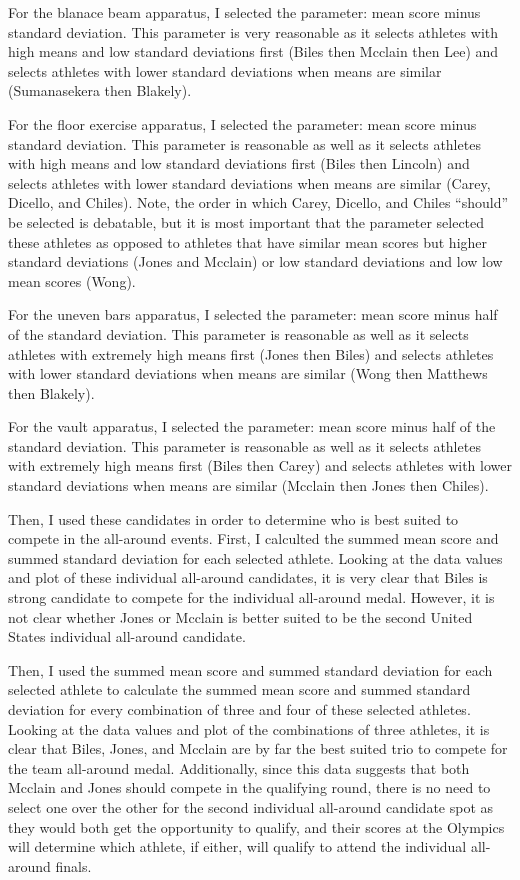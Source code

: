 \documentclass[12pt]{article}
\begin{document}
For the blanace beam apparatus, I selected the parameter: mean score minus standard deviation. This parameter 
is very reasonable as it selects athletes with high means and low standard deviations first (Biles then Mcclain 
then Lee) and selects athletes with lower standard deviations when means are similar (Sumanasekera then Blakely).

For the floor exercise apparatus, I selected the parameter: mean score minus standard deviation. This parameter 
is reasonable as well as it selects athletes with high means and low standard deviations first (Biles then Lincoln) 
and selects athletes with lower standard deviations when means are similar (Carey, Dicello, and Chiles). Note, the 
order in which Carey, Dicello, and Chiles ``should'' be selected is debatable, but it is most important that the 
parameter selected these athletes as opposed to athletes that have similar mean scores but higher standard deviations 
(Jones and Mcclain) or low standard deviations and low low mean scores (Wong).

For the uneven bars apparatus, I selected the parameter: mean score minus half of the standard deviation. 
This parameter is reasonable as well as it selects athletes with extremely high means first (Jones then Biles) and selects 
athletes with lower standard deviations when means are similar (Wong then Matthews then Blakely). 

For the vault apparatus, I selected the parameter: mean score minus half of the standard deviation. 
This parameter is reasonable as well as it selects athletes with extremely high means first (Biles then Carey) and selects 
athletes with lower standard deviations when means are similar (Mcclain then Jones then Chiles). 

Then, I used these candidates in order to determine who is best suited to compete in the all-around events. 
First, I calculted the summed mean score and summed standard deviation for each selected athlete. Looking at the data 
values and plot of these individual all-around candidates, it is very clear that Biles is strong candidate to 
compete for the individual all-around medal. However, it is not clear whether Jones or Mcclain is better suited 
to be the second United States individual all-around candidate.

Then, I used the summed mean score and summed standard deviation for each selected athlete to calculate the 
summed mean score and summed standard deviation for every combination of 
three and four of these selected athletes. Looking at the data values and plot of the combinations of three athletes, 
it is clear that Biles, Jones, and Mcclain are by far the best suited trio to compete for the team all-around medal. 
Additionally, since this data suggests that both Mcclain and Jones should compete in the qualifying round, there 
is no need to select one over the other for the second individual all-around candidate spot as they would both get 
the opportunity to qualify, and their scores at the Olympics will determine which athlete, if either, will qualify 
to attend the individual all-around finals. 
\end{document}
